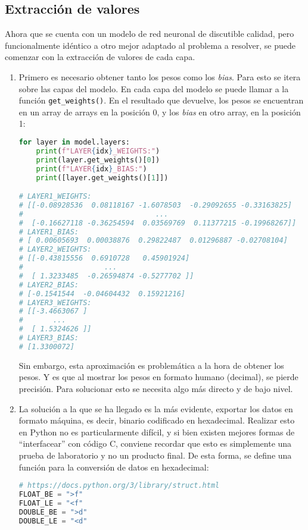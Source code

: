 \subsection{Extracción de valores}
\label{ssec:extraccion_valores}
Ahora que se cuenta con un modelo de red neuronal de discutible calidad, pero funcionalmente idéntico a otro mejor adaptado al problema a resolver, se puede comenzar con la extracción de valores de cada capa.

\begin{enumerate}
    \item Primero es necesario obtener tanto los pesos como los \textit{bias}. Para esto se itera sobre las capas del modelo. En cada capa del modelo se puede llamar a la función \texttt{get\_weights()}. En el resultado que devuelve, los pesos se encuentran en un array de arrays en la posición 0, y los \textit{bias} en otro array, en la posición 1:\medskip
\begin{lstlisting}[language=Python]
for layer in model.layers:
    print(f"LAYER{idx}_WEIGHTS:")
    print(layer.get_weights()[0])
    print(f"LAYER{idx}_BIAS:")
    print([layer.get_weights()[1]])

# LAYER1_WEIGHTS:
# [[-0.08928536  0.08118167 -1.6078503  -0.29092655 -0.33163825]
#                               ...
#  [-0.16627118 -0.36254594  0.03569769  0.11377215 -0.19968267]]
# LAYER1_BIAS:
# [ 0.00605693  0.00038876  0.29822487  0.01296887 -0.02708104]
# LAYER2_WEIGHTS:
# [[-0.43815556  0.6910728   0.45901924]
#                   ...
#  [ 1.3233485  -0.26594874 -0.5277702 ]]
# LAYER2_BIAS:
# [-0.1541544  -0.04604432  0.15921216]
# LAYER3_WEIGHTS:
# [[-3.4663067 ]
#       ...
#  [ 1.5324626 ]]
# LAYER3_BIAS:
# [1.3300072]
\end{lstlisting}
    Sin embargo, esta aproximación es problemática a la hora de obtener los pesos. Y es que al mostrar los pesos en formato humano (decimal), se pierde precisión. Para solucionar esto se necesita algo más directo y de bajo nivel.
    
    \item La solución a la que se ha llegado es la más evidente, exportar los datos en formato máquina, es decir, binario codificado en hexadecimal. Realizar esto en Python no es particularmente difícil, y si bien existen mejores formas de ``interfacear'' con código C, conviene recordar que esto es simplemente una prueba de laboratorio y no un producto final. De esta forma, se define una función para la conversión de datos en hexadecimal:\medskip
\begin{lstlisting}[language=Python]
# https://docs.python.org/3/library/struct.html
FLOAT_BE = ">f"
FLOAT_LE = "<f"
DOUBLE_BE = ">d"
DOUBLE_LE = "<d"


\end{lstlisting}
\end{enumerate}
